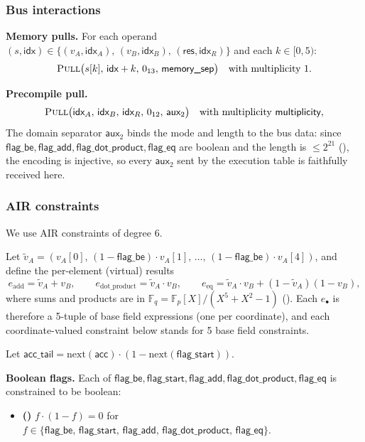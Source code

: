 \documentclass{article}
\theoremstyle{definition}
\newcommand{\Fp}{\mathbb F_p}
\newcommand{\Fq}{\mathbb F_q}
\begin{document}
\subsubsection{Bus interactions}

\textbf{Memory pulls.} For each operand $(s, \textsf{idx}) \in \{(v_A, \textsf{idx}_A),\, (v_B, \textsf{idx}_B),\, (\textsf{res}, \textsf{idx}_R)\}$ and each $k \in [0, 5)$:
\[
\textsc{Pull}\big(s[k],\, \textsf{idx} + k,\, 0_{13},\, \textsf{memory\_sep}\big) \quad \text{with multiplicity } 1.
\]

\textbf{Precompile pull.}
\[
\textsc{Pull}\big(\textsf{idx}_A,\, \textsf{idx}_B,\, \textsf{idx}_R,\, 0_{12},\, \textsf{aux}_2\big) \quad \text{with multiplicity } \textsf{multiplicity},
\]
The domain separator $\textsf{aux}_2$ binds the mode and length to the bus data: since $\textsf{flag\_be}, \textsf{flag\_add}, \textsf{flag\_dot\_product}, \textsf{flag\_eq}$ are boolean and the length is $\leq 2^{21}$ (), the encoding is injective, so every $\textsf{aux}_2$ sent by the execution table is faithfully received here.


\subsubsection{AIR constraints}

We use AIR constraints of degree 6.

\vspace{2mm}

Let $\tilde v_A = (v_A[0],\, (1 - \textsf{flag\_be}) \cdot v_A[1],\, \dots,\, (1 - \textsf{flag\_be}) \cdot v_A[4])$, and define the per-element (virtual) results
\[
    e_\text{add} = \tilde v_A + v_B, \qquad e_\text{dot\_product} = \tilde v_A \cdot v_B, \qquad e_\text{eq} = \tilde v_A \cdot v_B + (1 - \tilde v_A)(1 - v_B),
\]
where sums and products are in $\Fq = \Fp[X]/(X^5 + X^2 - 1)$ (). Each $e_\bullet$ is therefore a 5-tuple of base field expressions (one per coordinate), and each coordinate-valued constraint below stands for 5 base field constraints.

Let $\textsf{acc\_tail} = \text{next}(\textsf{acc}) \cdot (1 - \text{next}(\textsf{flag\_start}))$.

\vspace{2mm}

\textbf{Boolean flags.} Each of $\textsf{flag\_be}, \textsf{flag\_start}, \textsf{flag\_add}, \textsf{flag\_dot\_product}, \textsf{flag\_eq}$ is constrained to be boolean:
\begin{itemize}
    \item {}\textbf{(\theequation)}\label{c:bool-flags}\hspace{1mm} $f \cdot (1 - f) = 0$ for $f \in \{\textsf{flag\_be},\, \textsf{flag\_start},\, \textsf{flag\_add},\, \textsf{flag\_dot\_product},\, \textsf{flag\_eq}\}$.
\end{itemize}
\end{document}
